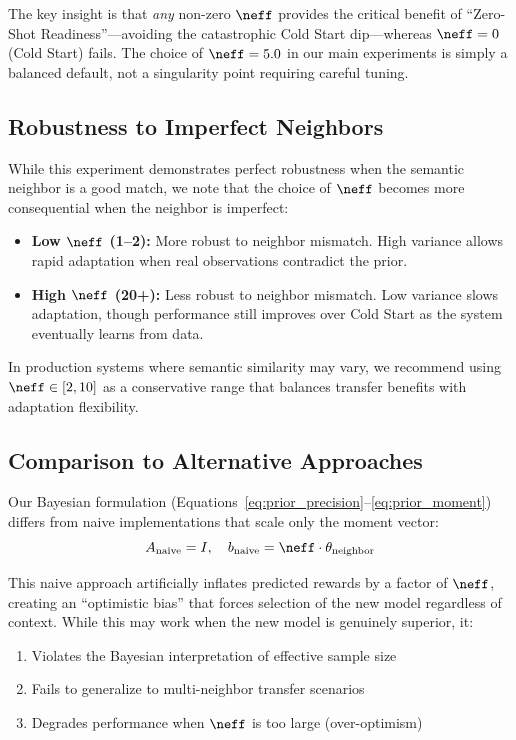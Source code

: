The key insight is that \emph{any} non-zero $\neff$ provides the critical 
benefit of ``Zero-Shot Readiness''---avoiding the catastrophic Cold Start dip---whereas 
$\neff=0$ (Cold Start) fails. The choice of $\neff=5.0$ in our 
main experiments is simply a balanced default, not a singularity point requiring 
careful tuning.

\subsection{Robustness to Imperfect Neighbors}

While this experiment demonstrates perfect robustness when the semantic neighbor is 
a good match, we note that the choice of $\neff$ becomes more consequential 
when the neighbor is imperfect:

\begin{itemize}[leftmargin=*,noitemsep]
    \item \textbf{Low $\neff$ (1--2):} More robust to neighbor mismatch. 
    High variance allows rapid adaptation when real observations contradict the prior.
    
    \item \textbf{High $\neff$ (20+):} Less robust to neighbor mismatch. 
    Low variance slows adaptation, though performance still improves over Cold Start 
    as the system eventually learns from data.
\end{itemize}

In production systems where semantic similarity may vary, we recommend using 
$\neff \in [2, 10]$ as a conservative range that balances transfer benefits 
with adaptation flexibility.

\subsection{Comparison to Alternative Approaches}

Our Bayesian formulation (Equations~\ref{eq:prior_precision}--\ref{eq:prior_moment}) 
differs from naive implementations that scale only the moment vector:
\begin{equation}
A_{\text{naive}} = I, \quad b_{\text{naive}} = \neff \cdot \theta_{\text{neighbor}}
\end{equation}

This naive approach artificially inflates predicted rewards by a factor of $\neff$, 
creating an ``optimistic bias'' that forces selection of the new model regardless of 
context. While this may work when the new model is genuinely superior, it:
\begin{enumerate}[leftmargin=*,noitemsep]
    \item Violates the Bayesian interpretation of effective sample size
    \item Fails to generalize to multi-neighbor transfer scenarios
    \item Degrades performance when $\neff$ is too large (over-optimism)
\end{enumerate}

